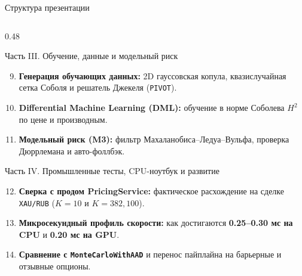 \documentclass[aspectratio=169, 9pt]{beamer}
\begin{document}
\begin{frame}{Структура презентации}
\begin{columns}[T]
    \begin{column}{0.48\textwidth}
      \begin{block}{Часть III. Обучение, данные и модельный риск}
        \begin{enumerate}\setcounter{enumi}{8}
          \item \textbf{Генерация обучающих данных:} 2D гауссовская копула, квазислучайная сетка Соболя и решатель Джекеля (\texttt{PIVOT}).
          \item \textbf{Differential Machine Learning (DML):} обучение в норме Соболева $H^2$ по цене и производным.
          \item \textbf{Модельный риск (M3):} фильтр Махаланобиса--Ледуа--Вульфа, проверка Дюррлемана и авто-фоллбэк.
        \end{enumerate}
      \end{block}

      \begin{exampleblock}{Часть IV. Промышленные тесты, CPU-ноутбук и развитие}
        \begin{enumerate}\setcounter{enumi}{11}
          \item \textbf{Сверка с продом PricingService:} фактическое расхождение на сделке \texttt{XAU/RUB} ($K=10$ и $K=382,100$).
          \item \textbf{Микросекундный профиль скорости:} как достигаются \textbf{0.25--0.30 мс на CPU} и \textbf{0.20 мс на GPU}.
          \item \textbf{Сравнение с \texttt{MonteCarloWithAAD}} и перенос пайплайна на барьерные и отзывные опционы.
        \end{enumerate}
      \end{exampleblock}
    \end{column}
  \end{columns}
\end{frame}
\end{document}
